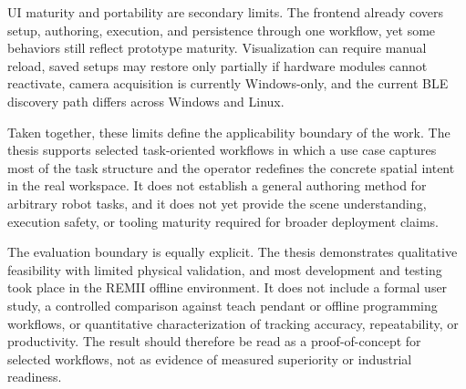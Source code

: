 UI maturity and portability are secondary limits. The frontend already covers setup, authoring, execution, and persistence through one workflow, yet some behaviors still reflect prototype maturity. Visualization can require manual reload, saved setups may restore only partially if hardware modules cannot reactivate, camera acquisition is currently Windows-only, and the current BLE discovery path differs across Windows and Linux.

Taken together, these limits define the applicability boundary of the work. The thesis supports selected task-oriented workflows in which a use case captures most of the task structure and the operator redefines the concrete spatial intent in the real workspace. It does not establish a general authoring method for arbitrary robot tasks, and it does not yet provide the scene understanding, execution safety, or tooling maturity required for broader deployment claims.

The evaluation boundary is equally explicit. The thesis demonstrates qualitative feasibility with limited physical validation, and most development and testing took place in the REMII offline environment. It does not include a formal user study, a controlled comparison against teach pendant or offline programming workflows, or quantitative characterization of tracking accuracy, repeatability, or productivity. The result should therefore be read as a proof-of-concept for selected workflows, not as evidence of measured superiority or industrial readiness.

